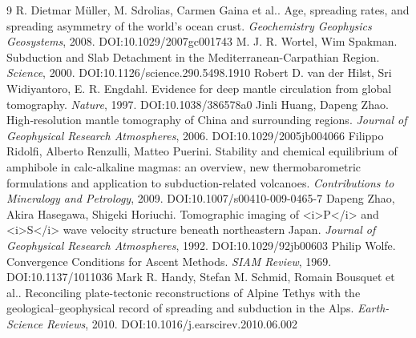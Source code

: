\documentclass[11pt]{article}
\begin{document}
\begin{thebibliography}{9}
 R. Dietmar Müller, M. Sdrolias, Carmen Gaina et al.. Age, spreading rates, and spreading asymmetry of the world's ocean crust. \emph{Geochemistry Geophysics Geosystems}, 2008. DOI:10.1029/2007gc001743
 M. J. R. Wortel, Wim Spakman. Subduction and Slab Detachment in the Mediterranean-Carpathian Region. \emph{Science}, 2000. DOI:10.1126/science.290.5498.1910
 Robert D. van der Hilst, Sri Widiyantoro, E. R. Engdahl. Evidence for deep mantle circulation from global tomography. \emph{Nature}, 1997. DOI:10.1038/386578a0
 Jinli Huang, Dapeng Zhao. High‐resolution mantle tomography of China and surrounding regions. \emph{Journal of Geophysical Research Atmospheres}, 2006. DOI:10.1029/2005jb004066
 Filippo Ridolfi, Alberto Renzulli, Matteo Puerini. Stability and chemical equilibrium of amphibole in calc-alkaline magmas: an overview, new thermobarometric formulations and application to subduction-related volcanoes. \emph{Contributions to Mineralogy and Petrology}, 2009. DOI:10.1007/s00410-009-0465-7
 Dapeng Zhao, Akira Hasegawa, Shigeki Horiuchi. Tomographic imaging of <i>P</i> and <i>S</i> wave velocity structure beneath northeastern Japan. \emph{Journal of Geophysical Research Atmospheres}, 1992. DOI:10.1029/92jb00603
 Philip Wolfe. Convergence Conditions for Ascent Methods. \emph{SIAM Review}, 1969. DOI:10.1137/1011036
 Mark R. Handy, Stefan M. Schmid, Romain Bousquet et al.. Reconciling plate-tectonic reconstructions of Alpine Tethys with the geological–geophysical record of spreading and subduction in the Alps. \emph{Earth-Science Reviews}, 2010. DOI:10.1016/j.earscirev.2010.06.002
\end{thebibliography}
\end{document}
